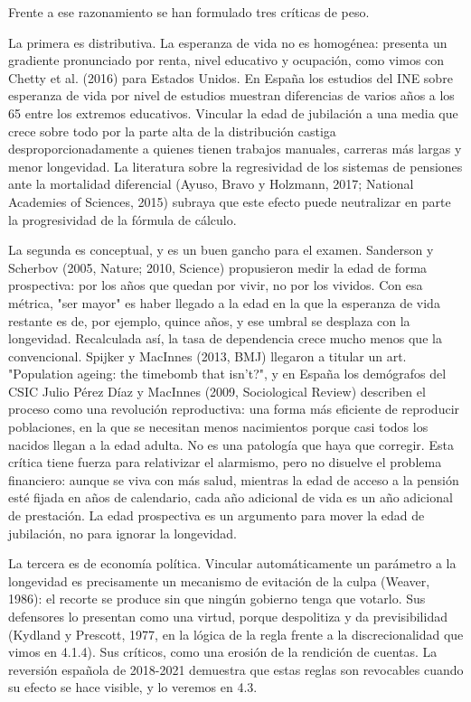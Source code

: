 \documentclass[10pt,a4paper]{article}
\begin{document}
Frente a ese razonamiento se han formulado tres críticas de peso.

La primera es distributiva. La esperanza de vida no es homogénea: presenta un gradiente pronunciado por renta, nivel educativo y ocupación, como vimos con Chetty et al. (2016) para Estados Unidos. En España los estudios del INE sobre esperanza de vida por nivel de estudios muestran diferencias de varios años a los 65 entre los extremos educativos. Vincular la edad de jubilación a una media que crece sobre todo por la parte alta de la distribución castiga desproporcionadamente a quienes tienen trabajos manuales, carreras más largas y menor longevidad. La literatura sobre la regresividad de los sistemas de pensiones ante la mortalidad diferencial (Ayuso, Bravo y Holzmann, 2017; National Academies of Sciences, 2015) subraya que este efecto puede neutralizar en parte la progresividad de la fórmula de cálculo.

La segunda es conceptual, y es un buen gancho para el examen. Sanderson y Scherbov (2005, Nature; 2010, Science) propusieron medir la edad de forma prospectiva: por los años que quedan por vivir, no por los vividos. Con esa métrica, "ser mayor" es haber llegado a la edad en la que la esperanza de vida restante es de, por ejemplo, quince años, y ese umbral se desplaza con la longevidad. Recalculada así, la tasa de dependencia crece mucho menos que la convencional. Spijker y MacInnes (2013, BMJ) llegaron a titular un art. "Population ageing: the timebomb that isn't?", y en España los demógrafos del CSIC Julio Pérez Díaz y MacInnes (2009, Sociological Review) describen el proceso como una revolución reproductiva: una forma más eficiente de reproducir poblaciones, en la que se necesitan menos nacimientos porque casi todos los nacidos llegan a la edad adulta. No es una patología que haya que corregir. Esta crítica tiene fuerza para relativizar el alarmismo, pero no disuelve el problema financiero: aunque se viva con más salud, mientras la edad de acceso a la pensión esté fijada en años de calendario, cada año adicional de vida es un año adicional de prestación. La edad prospectiva es un argumento para mover la edad de jubilación, no para ignorar la longevidad.

La tercera es de economía política. Vincular automáticamente un parámetro a la longevidad es precisamente un mecanismo de evitación de la culpa (Weaver, 1986): el recorte se produce sin que ningún gobierno tenga que votarlo. Sus defensores lo presentan como una virtud, porque despolitiza y da previsibilidad (Kydland y Prescott, 1977, en la lógica de la regla frente a la discrecionalidad que vimos en 4.1.4). Sus críticos, como una erosión de la rendición de cuentas. La reversión española de 2018-2021 demuestra que estas reglas son revocables cuando su efecto se hace visible, y lo veremos en 4.3.
\end{document}
